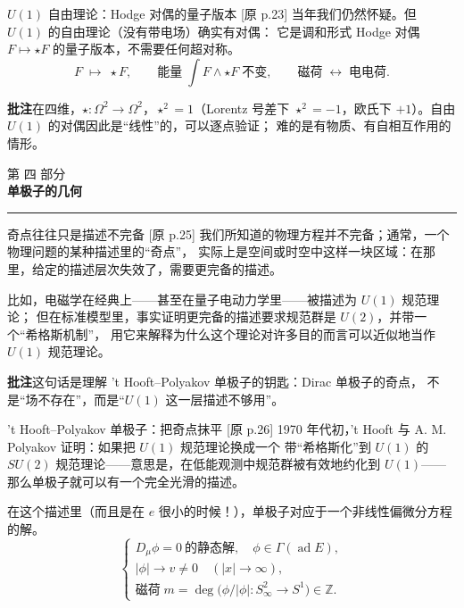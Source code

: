 \documentclass[aspectratio=169,12pt]{ctexbeamer}
\newcommand{\ZZ}{\mathbb{Z}}
\newcommand{\ad}{\operatorname{ad}}
\newcommand{\srcp}[1]{{\color{black!40}\scriptsize[原 p.#1]}}
\newcommand{\partframe}[2]{%
\begin{frame}[plain]
  \vspace*{2.6cm}
  {\color{black!35}\large 第 #1 部分}\\[0.8em]
  {\LARGE\bfseries #2}\\[1.2em]
  {\color{black!40}\rule{2.2cm}{0.4pt}}
\end{frame}}
\begin{document}
\begin{frame}{$U(1)$ 自由理论：Hodge 对偶的量子版本}
  \srcp{23} 当年我们仍然怀疑。但 $U(1)$ 的自由理论（没有带电场）确实有对偶：
  它是调和形式 Hodge 对偶 $F\mapsto\star F$ 的量子版本，不需要任何超对称。
  \[
    F\;\longmapsto\;\star F,\qquad
    \text{能量}\;\int F\wedge\star F\;\text{不变},\qquad
    \text{磁荷}\;\leftrightarrow\;\text{电电荷}.
  \]
  \begin{beizhu}
  \textbf{批注}\quad 在四维，$\star:\Omega^2\to\Omega^2$，$\star^2=1$（Lorentz 号差下
  $\star^2=-1$，欧氏下 $+1$）。自由 $U(1)$ 的对偶因此是“线性”的，可以逐点验证；
  难的是有物质、有自相互作用的情形。
  \end{beizhu}
\end{frame}

\partframe{四}{单极子的几何}

\begin{frame}{奇点往往只是描述不完备}
  \srcp{25} 我们所知道的物理方程并不完备；通常，一个物理问题的某种描述里的“奇点”，
  实际上是空间或时空中这样一块区域：在那里，给定的描述层次失效了，需要更完备的描述。
  \vspace{0.5em}

  比如，电磁学在经典上——甚至在量子电动力学里——被描述为 $U(1)$ 规范理论；
  但在标准模型里，事实证明更完备的描述要求规范群是 $U(2)$，并带一个“希格斯机制”，
  用它来解释为什么这个理论对许多目的而言可以近似地当作 $U(1)$ 规范理论。
  \begin{beizhu}
  \textbf{批注}\quad 这句话是理解 't Hooft--Polyakov 单极子的钥匙：Dirac 单极子的奇点，
  不是“场不存在”，而是“$U(1)$ 这一层描述不够用”。
  \end{beizhu}
\end{frame}

\begin{frame}{'t Hooft--Polyakov 单极子：把奇点抹平}
  \srcp{26} 1970 年代初，'t Hooft 与 A. M. Polyakov 证明：如果把 $U(1)$ 规范理论换成一个
  带“希格斯化”到 $U(1)$ 的 $SU(2)$ 规范理论——意思是，在低能观测中规范群被有效地约化到
  $U(1)$——那么单极子就可以有一个完全光滑的描述。
  \vspace{0.4em}

  在这个描述里（而且是在 $e$ 很小的时候！），单极子对应于一个非线性偏微分方程的解。
  \[
    \begin{cases}
      D_\mu\phi=0\ \text{的静态解},\quad \phi\in\Gamma(\ad E),\\
      |\phi|\to v\neq0\quad (|x|\to\infty),\\
      \text{磁荷}\;m=\deg\big(\phi/|\phi|:S^2_\infty\to S^1\big)\in\ZZ .
    \end{cases}
  \]
\end{frame}
\end{document}
